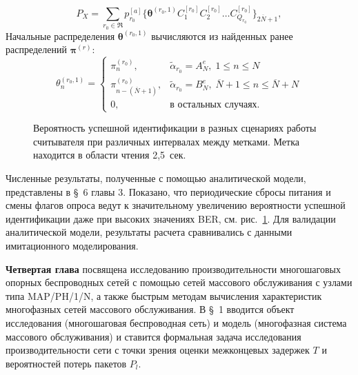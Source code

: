 $$
	P_X = \sum\limits_{r_0 \in \mathfrak{R}} p_{r_0}^{[a]} \{ \bm{\theta}^{(r_0,1)} C_1^{[r_0]} C_2^{[r_0]} \dots C_{Q_{r_0}}^{[r_0]} \}_{2\overline{N}+1},
$$
Начальные распределения $\bm{\theta}^{(r_0,1)}$ вычисляются из найденных ранее распределений $\bm{\pi}^{(r)}$:
$$
  \theta_n^{(r_0,1)} = \begin{cases}
    \pi^{(r_0)}_n,                      &\widetilde{\alpha}_{r_0} = A^e_N,\; 1 \leqslant n \leqslant N\\
    \pi^{(r_0)}_{n - (\overline{N}+1)}, &\widetilde{\alpha}_{r_0} = B^e_N,\; \overline{N}+1 \leqslant n \leqslant \overline{N}+N\\
    0,                                  &\text{в остальных случаях.}
  \end{cases}
$$

\begin{figure}[ht!]
  \caption{Вероятность успешной идентификации в разных сценариях работы считывателя при различных интервалах между метками. Метка находится в области чтения 2,5~сек.}\label{fig:id_prob_var_scenario}
\end{figure}

Численные результаты, полученные с помощью аналитической модели, представлены в \S~6 главы 3. Показано, что периодические сбросы питания и смены флагов опроса ведут к значительному увеличению вероятности успешной идентификации даже при высоких значениях BER, см. рис.~\ref{fig:id_prob_var_scenario}. Для валидации аналитической модели, результаты расчета сравнивались с данными имитационного моделирования.



\textbf{Четвертая глава}
посвящена исследованию производительности многошаговых опорных беспроводных сетей с помощью сетей массового обслуживания с узлами типа MAP/PH/1/N, а также быстрым методам вычисления характеристик многофазных сетей массового обслуживания. В \S~1 вводится объект исследования (многошаговая беспроводная сеть) и модель (многофазная система массового обслуживания) и ставится формальная задача исследования производительности сети с точки зрения оценки межконцевых задержек $T$ и вероятностей потерь пакетов $P_l$.

